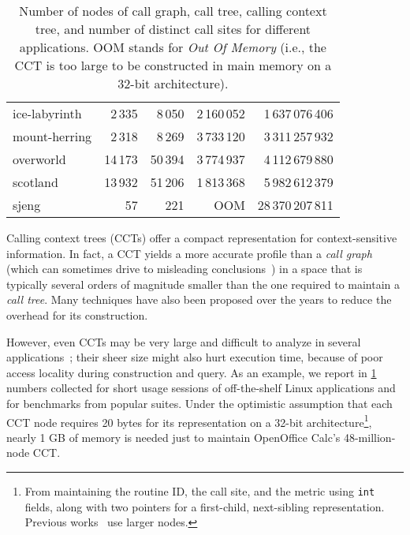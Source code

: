 \begin{table}[ht]
\begin{center}
\begin{tabular}{|l|r r r r|}
ice-labyrinth & 2\,335 & 8\,050 & 2\,160\,052 & 1\,637\,076\,406 \\
mount-herring & 2\,318 & 8\,269 & 3\,733\,120 & 3\,311\,257\,932 \\
overworld & 14\,173 & 50\,394 & 3\,774\,937 & 4\,112\,679\,880 \\
scotland & 13\,932 & 51\,206 & 1\,813\,368 & 5\,982\,612\,379 \\
sjeng & 57 & 221 & OOM & 28\,370\,207\,811 \\
\hline
\end{tabular}
\vspace{4mm}
\caption{\label{tab:CCTsize} Number of nodes of call graph, call tree, calling context tree, and number of distinct call sites for different applications. OOM stands for {\em Out Of Memory} (i.e., the CCT is too large to be constructed in main memory on a 32-bit architecture). %
}
\end{center}
\end{table}
\vspace{-8mm}
\ifauthorea{\newline}{}

Calling context trees (CCTs) offer a compact representation for context-sensitive information. In fact, a CCT yields a more accurate profile than a {\em call graph} (which can sometimes drive to misleading conclusions~\cite{Ponder88, Spivey04}) in a space that is typically several orders of magnitude smaller than the one required to maintain a {\em call tree}. Many techniques have also been proposed over the years to reduce the overhead for its construction.

However, even CCTs may be very large and difficult to analyze in several applications~\cite{Bond07,Zhuang06}; their sheer size might also hurt execution time, because of poor access locality during construction and query. As an example, we report in \mytable\ref{tab:CCTsize} numbers collected for short usage sessions of off-the-shelf Linux applications and for benchmarks from popular suites. Under the optimistic assumption that each CCT node requires 20 bytes for its representation on a 32-bit architecture\footnote{From maintaining the routine ID, the call site, and the metric using {\tt int} fields, along with two pointers for a first-child, next-sibling representation. Previous works~\cite{Ammons97,Spivey04} use larger nodes.}, nearly 1 GB of memory is needed just to maintain OpenOffice Calc's 48-million-node CCT.

